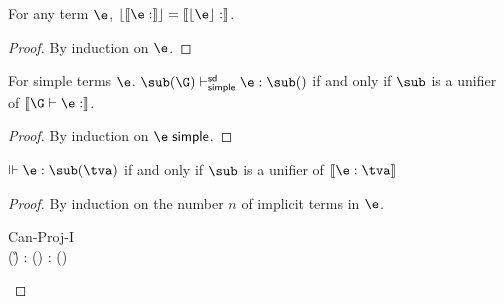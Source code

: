 \documentclass[acmsmall,screen,nonacm,review]{acmart}
\begin{document}
\begin{lemma}
  For any term $\e$, $\cerase {\cinfer \e \t} = \cinfer {\eerase \e} \t$.
  \begin{proof}
    By induction on $\e$.
  \end{proof}
\end{lemma}

\begin{lemma}
  For simple terms $\e$.
  $\sub(\G) \thsimplesd \e : \sub(\t)$ if and only if $\sub$ is a unifier of $\csem {\G \th \e : \t}$.
  \begin{proof}
    By induction on $\e \simple$.
  \end{proof}
\end{lemma}

\begin{theorem}
  $\Th \e : \sub(\tv)$ if and only if $\sub$ is a unifier of $\csem {\e : \tv}$
  \begin{proof}
    By induction on the number $n$ of implicit terms in $\e$.
    \begin{proofcases}

	\begin{llproof}
\Hand	  {}
	\end{llproof}


	\begin{proofcases}
	  \proofcase{$\implies$}

	  \begin{proofcases}

	    \proofcasederivation
	      {Can-Proj-I}
	      {\eshape \E \e {\any \tvcs \Pi\iton \tvcs} \\ \sub(\G) \Th \E{} : \sub(\tv)}
	      {\Th \E{} : \sub(\tv)}


\end{proofcases}
\end{proofcases}
\end{proofcases}
\end{proof}
\end{theorem}
\end{document}
